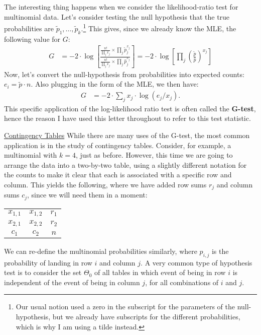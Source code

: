 \documentclass{tufte-handout}
\begin{document}
The interesting thing happens when we consider the likelihood-ratio
test for multinomial data. Let's consider testing the null hypothesis
that the true probabilities are $\tilde{p}_1, \ldots, \tilde{p}_k$.\footnote{
  Our usual notion used a zero in the subscript for the parameters of
  the null-hypothesis, but we already have subscripts for the different
  probabilities, which is why I am using a tilde instead.
}
This gives, since we already know the MLE, the following value for $G$:
\begin{align*}
G &= -2 \cdot \log \left[ \frac{
  \frac{n!}{\prod_j x_j} \times \prod_j \tilde{p}_j^{x_j}
}{
  \frac{n!}{\prod_j x_j} \times \prod_j \hat{p}_j^{x_j}
} \right] = -2 \cdot \log \left[ \prod_j \left( \frac{\tilde{p}}{\hat{p}} \right)^{x_j} \right]
\end{align*}
Now, let's convert the null-hypothesis from probabilities into expected
counts: $e_i = \tilde{p} \cdot n$. Also plugging in the form of the MLE,
we then have:
\begin{align*}
G &= -2 \cdot \sum_j x_j \cdot \log(e_j / x_j).
\end{align*}
This specific application of the log-likelihood ratio test is often called
the \textbf{G-test}, hence the reason I have used this letter throughout
to refer to this test statistic.

\newpage

\noindent \underline{Contingency Tables}
While there are many uses of the G-test, the most common application 
is in the study of contingency tables. Consider, for example, a multinomial
with $k=4$, just as before. However, this time we are going to arrange
the data into a two-by-two table, using a slightly different notation for
the counts to make it clear that each is associated with a specific row
and column. This yields the following, where we have added row sums $r_j$
and column sums $c_j$, since we will need them in a moment: 
\begin{center}
\begin{tabular}{*3c}
\cline{1-2}
  \multicolumn{1}{|c|}{$x_{1,1}$} &
  \multicolumn{1}{|c|}{$x_{1,2}$} &
  \multicolumn{1}{|c}{$r_1$} \\  
\cline{1-2}
  \multicolumn{1}{|c|}{$x_{2,1}$} &
  \multicolumn{1}{|c|}{$x_{2,2}$} &
  \multicolumn{1}{|c}{$r_2$} \\ 
\cline{1-2}
  \multicolumn{1}{c}{$c_1$}
  & \multicolumn{1}{c}{$c_2$}
  & \multicolumn{1}{c}{$n$}
\end{tabular}
\end{center}
We can re-define the multinomial probabilities similarly, where $p_{i,j}$
is the probability of landing in row $i$ and column $j$. A very common
type of hypothesis test is to consider the set $\Theta_0$ of all tables
in which event of being in row $i$ is independent of the event of being
in column $j$, for all combinations of $i$ and $j$.
\end{document}
